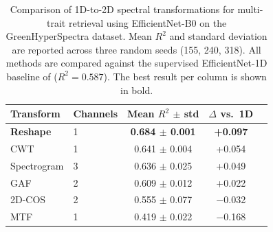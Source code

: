 \begin{table}[htbp]
\centering
\caption{Comparison of 1D-to-2D spectral transformations for multi-trait retrieval using EfficientNet-B0 on the GreenHyperSpectra dataset. Mean $R^2$ and standard deviation are reported across three random seeds (155, 240, 318). All methods are compared against the supervised EfficientNet-1D baseline of \citet{cherif2025greenhyperspectra} ($R^2 = 0.587$). The best result per column is shown in bold.}
\label{tab:transforms}
\begin{tabular}{llccr}
\toprule
Transform & Channels & Mean $R^2$ $\pm$ std & $\Delta$ vs.\ 1D \\%
\midrule
\textbf{Reshape}     & 1 & \textbf{0.684 $\pm$ 0.001} & \textbf{+0.097} \\%
CWT                   & 1 & 0.641 $\pm$ 0.004          & +0.054         \\%
Spectrogram           & 3 & 0.636 $\pm$ 0.025          & +0.049         \\%
GAF                   & 2 & 0.609 $\pm$ 0.012          & +0.022         \\%
2D-COS                & 2 & 0.555 $\pm$ 0.077          & $-$0.032       \\%
MTF                   & 1 & 0.419 $\pm$ 0.022          & $-$0.168        \\%
\bottomrule
\end{tabular}
\end{table}

